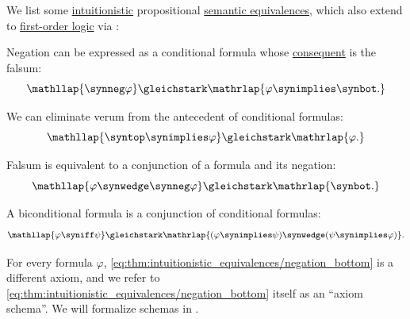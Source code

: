 \begin{proposition}\label{thm:intuitionistic_equivalences}
  We list some \hyperref[def:truth_value_algebra/intuitionistic]{intuitionistic} propositional \hyperref[def:semantic_equivalence]{semantic equivalences}, which also extend to \hyperref[def:first_order_logic]{first-order logic} via :
  \begin{thmenum}
     Negation can be expressed as a conditional formula whose \hyperref[def:conditional_formula/consequent]{consequent} is the falsum:
    \begin{equation}\label{eq:thm:intuitionistic_equivalences/negation_bottom}
      \mathllap{\synneg \varphi} \gleichstark \mathrlap{\varphi \synimplies \synbot.}
    \end{equation}

     We can eliminate verum from the antecedent of conditional formulas:
    \begin{equation}\label{eq:thm:intuitionistic_equivalences/top_elim}
      \mathllap{\syntop \synimplies \varphi} \gleichstark \mathrlap{\varphi.}
    \end{equation}

     Falsum is equivalent to a conjunction of a formula and its negation:
    \begin{equation}\label{eq:thm:intuitionistic_equivalences/contradiction}
      \mathllap{\varphi \synwedge \synneg \varphi} \gleichstark \mathrlap{\synbot.}
    \end{equation}

     A biconditional formula is a conjunction of conditional formulas:
    \begin{equation}\label{eq:thm:intuitionistic_equivalences/biconditional_via_conditionals}
      \mathllap{\varphi \syniff \psi} \gleichstark \mathrlap{(\varphi \synimplies \psi) \synwedge (\psi \synimplies \varphi)}.
    \end{equation}
  \end{thmenum}
\end{proposition}
\begin{comments}
  \item For every formula \( \varphi \), \eqref{eq:thm:intuitionistic_equivalences/negation_bottom} is a different axiom, and we refer to \eqref{eq:thm:intuitionistic_equivalences/negation_bottom} itself as an \enquote{axiom schema}. We will formalize schemas in .
\end{comments}

